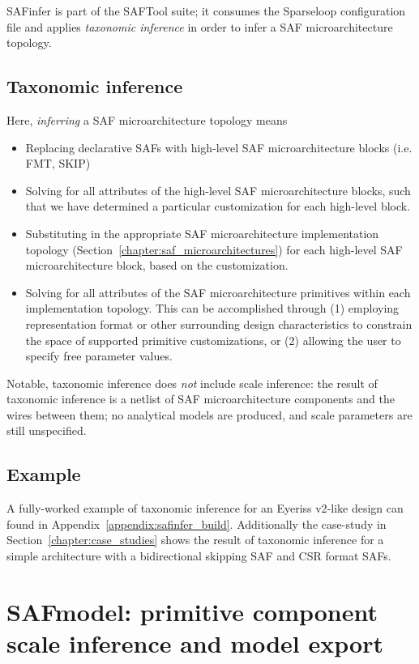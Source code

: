SAFinfer is part of the SAFTool suite; it consumes the Sparseloop configuration file and applies \textit{taxonomic inference} in order to infer a SAF microarchitecture topology.

\subsection{Taxonomic inference}

Here, \textit{inferring} a SAF microarchitecture topology means

\begin{itemize}
\item Replacing declarative SAFs with high-level SAF microarchitecture blocks (i.e. FMT, SKIP) 
\item Solving for all attributes of the high-level SAF microarchitecture blocks, such that we have determined a particular customization for each high-level block.
\item Substituting in the appropriate SAF microarchitecture implementation topology (Section~\ref{chapter:saf_microarchitectures}) for each high-level SAF microarchitecture block, based on the customization.
\item Solving for all attributes of the SAF microarchitecture primitives within each implementation topology. This can be accomplished through (1) employing representation format or other surrounding design characteristics to constrain the space of supported primitive customizations, or (2) allowing the user to specify free parameter values.
\end{itemize}

Notable, taxonomic inference does \textit{not} include scale inference: the result of taxonomic inference is a netlist of SAF microarchitecture components and the wires between them; no analytical models are produced, and scale parameters are still unspecified.

\subsection{Example}

A fully-worked example of taxonomic inference for an Eyeriss v2\cite{eyerissv2}-like design can found in Appendix~\ref{appendix:safinfer_build}. Additionally the case-study in Section~\ref{chapter:case_studies} shows the result of taxonomic inference for a simple architecture with a bidirectional skipping SAF and CSR format SAFs.


\section{SAFmodel: primitive component scale inference and model export}

